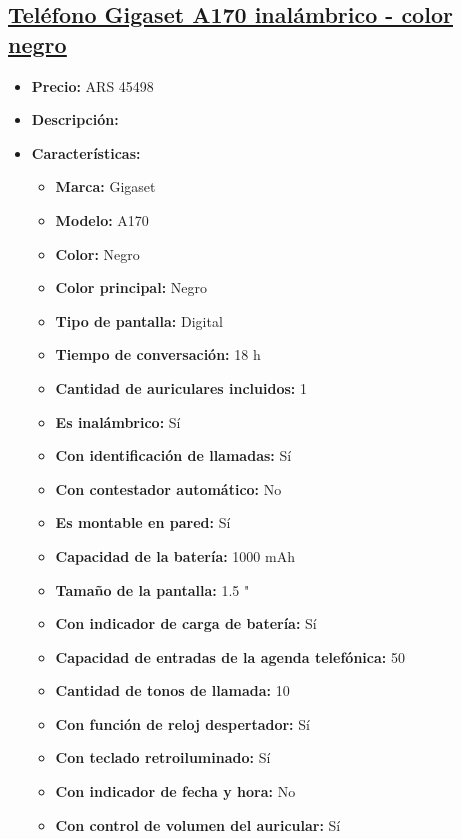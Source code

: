 \documentclass{article}
\begin{document}
\begin{adjustwidth}{2em}{}

\subsection{\uline{\href{https://www.mercadolibre.com.ar/telefono-gigaset-a170-inalambrico-color-negro/p/MLA15169105}{Teléfono Gigaset A170 inalámbrico - color negro}}}
\begin{itemize}
    \item \textbf{Precio:} ARS 45498
    \item \textbf{Descripción:} 
    \item \textbf{Características:} 
    \begin{itemize}
        \item \textbf {Marca:} Gigaset
    \item \textbf {Modelo:} A170
    \item \textbf {Color:} Negro
    \item \textbf {Color principal:} Negro
    \item \textbf {Tipo de pantalla:} Digital
    \item \textbf {Tiempo de conversación:} 18 h
    \item \textbf {Cantidad de auriculares incluidos:} 1
    \item \textbf {Es inalámbrico:} Sí
    \item \textbf {Con identificación de llamadas:} Sí
    \item \textbf {Con contestador automático:} No
    \item \textbf {Es montable en pared:} Sí
    \item \textbf {Capacidad de la batería:} 1000 mAh
    \item \textbf {Tamaño de la pantalla:} 1.5 "
    \item \textbf {Con indicador de carga de batería:} Sí
    \item \textbf {Capacidad de entradas de la agenda telefónica:} 50
    \item \textbf {Cantidad de tonos de llamada:} 10
    \item \textbf {Con función de reloj despertador:} Sí
    \item \textbf {Con teclado retroiluminado:} Sí
    \item \textbf {Con indicador de fecha y hora:} No
    \item \textbf {Con control de volumen del auricular:} Sí
    \end{itemize}
\end{itemize}

\vspace{1\baselineskip} %
\end{adjustwidth}
\end{document}
